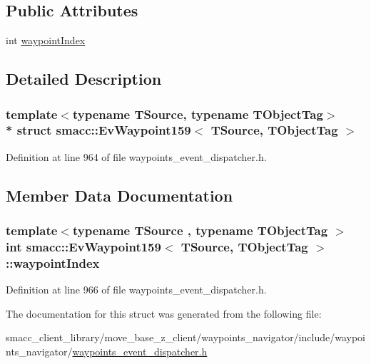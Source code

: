 \subsection*{Public Attributes}
\begin{DoxyCompactItemize}
\item 
int \hyperlink{structsmacc_1_1EvWaypoint159_a5f354c5fc2cd540d7c67edafde44f95a}{waypoint\+Index}
\end{DoxyCompactItemize}


\subsection{Detailed Description}
\subsubsection*{template$<$typename T\+Source, typename T\+Object\+Tag$>$\\*
struct smacc\+::\+Ev\+Waypoint159$<$ T\+Source, T\+Object\+Tag $>$}



Definition at line 964 of file waypoints\+\_\+event\+\_\+dispatcher.\+h.



\subsection{Member Data Documentation}
\subsubsection[{\texorpdfstring{waypoint\+Index}{waypointIndex}}]{\setlength{\rightskip}{0pt plus 5cm}template$<$typename T\+Source , typename T\+Object\+Tag $>$ int {\bf smacc\+::\+Ev\+Waypoint159}$<$ T\+Source, T\+Object\+Tag $>$\+::waypoint\+Index}\hypertarget{structsmacc_1_1EvWaypoint159_a5f354c5fc2cd540d7c67edafde44f95a}{}\label{structsmacc_1_1EvWaypoint159_a5f354c5fc2cd540d7c67edafde44f95a}


Definition at line 966 of file waypoints\+\_\+event\+\_\+dispatcher.\+h.



The documentation for this struct was generated from the following file\+:\begin{DoxyCompactItemize}
\item 
smacc\+\_\+client\+\_\+library/move\+\_\+base\+\_\+z\+\_\+client/waypoints\+\_\+navigator/include/waypoints\+\_\+navigator/\hyperlink{waypoints__event__dispatcher_8h}{waypoints\+\_\+event\+\_\+dispatcher.\+h}\end{DoxyCompactItemize}
